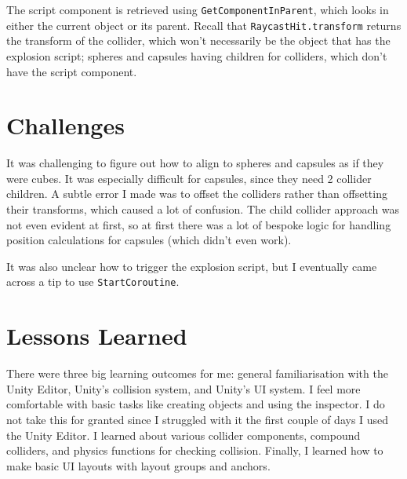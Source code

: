 \documentclass[a4paper, 12pt]{scrartcl}
\begin{document}
The script component is retrieved using \texttt{GetComponentInParent}, which looks in either the current object or its parent. Recall that \texttt{RaycastHit.transform} returns the transform of the collider, which won't necessarily be the object that has the explosion script; spheres and capsules having children for colliders, which don't have the script component.

\section{Challenges}
It was challenging to figure out how to align to spheres and capsules as if they were cubes. It was especially difficult for capsules, since they need 2 collider children. A subtle error I made was to offset the colliders rather than offsetting their transforms, which caused a lot of confusion. The child collider approach was not even evident at first, so at first there was a lot of bespoke logic for handling position calculations for capsules (which didn't even work).

It was also unclear how to trigger the explosion script, but I eventually came across a tip to use \texttt{StartCoroutine}.

\section{Lessons Learned}
There were three big learning outcomes for me: general familiarisation with the Unity Editor, Unity's collision system, and Unity's UI system. I feel more comfortable with basic tasks like creating objects and using the inspector. I do not take this for granted since I struggled with it the first couple of days I used the Unity Editor. I learned about various collider components, compound colliders, and physics functions for checking collision. Finally, I learned how to make basic UI layouts with layout groups and anchors.
\end{document}
